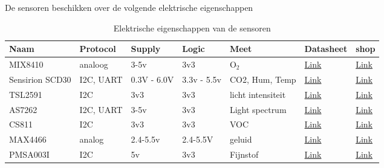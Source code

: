 De sensoren beschikken over de volgende elektrische eigenschappen
\begin{table}[H]
    \centering
    \begin{tabular}{|l|l|l|l|l|l|l|}
    \hline
        Naam & Protocol & Supply & Logic & Meet & Datasheet & shop  \\ \hline    
        MIX8410 & analoog & 3-5v & 3v3  & O$_2$ & \href{https://nl.mouser.com/datasheet/2/744/MIX8410_Electrochemical_Oxygen_Gas_Sensor_V1_6-1903280.pdf}{Link} & \href{https://nl.mouser.com/ProductDetail/Seeed-Studio/101990680?qs=DPoM0jnrROWBX\%2FfANB1IYw\%3D\%3D}{Link} \\ \hline
        Sensirion SCD30 & I2C, UART & 0.3V - 6.0V & 3.3v - 5.5v  & CO2, Hum, Temp & \href{https://docs.rs-online.com/2d49/0900766b816b6f9d.pdf}{Link} & \href{https://nl.rs-online.com/web/p/temperature-humidity-sensor-ics/1720552/}{Link} \\ \hline
        TSL2591 & I2C & 3v3 & 3v3  & licht intensiteit & \href{https://nl.mouser.com/datasheet/2/737/TSL25911_Datasheet_EN_v1-2490266.pdf}{Link} & \href{https://nl.mouser.com/ProductDetail/Adafruit/1980?qs=sGAEpiMZZMsKEdP9slC0YSnuTSFmm1LYraEQV\%252B1EsJM\%3D}{Link} \\ \hline
        AS7262 & I2C, UART & 3-5v & 3v3  & Light spectrum & \href{https://learn.adafruit.com/adafruit-as7262-6-channel-visible-light-sensor/overview}{Link} & \href{https://www.kiwi-electronics.nl/nl/adafruit-as7262-6-channel-visible-light-color-sensor-3575}{Link} \\ \hline
        CS811 & I2C & 3v3 & 3v3  & VOC & \href{https://learn.adafruit.com/adafruit-ccs811-air-quality-sensor}{Link} & \href{https://www.kiwi-electronics.com/nl/adafruit-ccs811-air-quality-sensor-breakout-voc-eco2-3205?search=CCS811}{Link} \\ \hline
        MAX4466 & analog & 2.4-5.5v & 2.4-5.5V  & geluid & \href{https://datasheets.maximintegrated.com/en/ds/MAX4465-MAX4469.pdf}{Link} & \href{https://www.kiwi-electronics.nl/nl/elektretmicrofoon-versterker-max4466-met-instelbare-gain-806}{Link} \\ \hline
        PMSA003I & I2C & 5v & 3v3  & Fijnstof & \href{hhttps://learn.adafruit.com/pmsa003i}{Link} & \href{https://www.kiwi-electronics.com/nl/adafruit-pmsa003i-air-quality-breakout-stemma-qt-qwiic-10427}{Link} \\ \hline
    \end{tabular}
    \caption{Elektrische eigenschappen van de sensoren}
    \label{tab:eingeschappensensoren}
\end{table}

